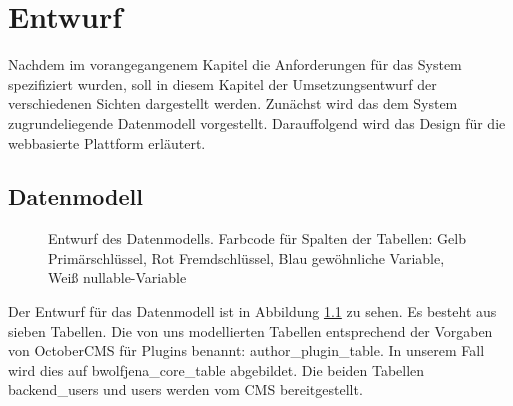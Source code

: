 
\chapter{Entwurf}
\label{chapter:design}
    Nachdem im vorangegangenem Kapitel die Anforderungen für das System spezifiziert wurden, soll in diesem Kapitel der Umsetzungsentwurf der verschiedenen Sichten dargestellt werden.
    Zunächst wird das dem System zugrundeliegende Datenmodell vorgestellt.
    Darauffolgend wird das Design für die webbasierte Plattform erläutert.     
    
    \section{Datenmodell}
        \begin{figure}[ht]
            \caption{Entwurf des Datenmodells. Farbcode für Spalten der Tabellen: Gelb Primärschlüssel, Rot Fremdschlüssel, Blau gewöhnliche Variable, Weiß \textsf{nullable-}Variable}
            \label{fig:datamodel}
        \end{figure}
    
        Der Entwurf für das Datenmodell ist in Abbildung \ref{fig:datamodel} zu sehen.
        Es besteht aus sieben Tabellen. Die von uns modellierten Tabellen entsprechend der Vorgaben von OctoberCMS für Plugins benannt: \textsf{author\_plugin\_table}. In unserem Fall wird dies auf \textsf{bwolfjena\_core\_table} abgebildet. Die beiden Tabellen \textsf{backend\_users} und \textsf{users} werden vom CMS bereitgestellt. 
        
